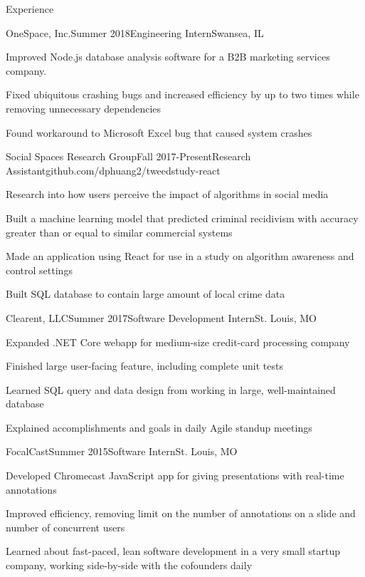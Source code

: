 \documentclass{tightResume}
\begin{document}
            \begin{rSection}{Experience}
                \begin{rSubsection}{OneSpace, Inc.}{Summer 2018}{Engineering Intern}{Swansea, IL} 
                \item Improved Node.js database analysis software for a B2B marketing services company. 
                \item Fixed ubiquitous crashing bugs and increased efficiency by up to two times while removing unnecessary dependencies
                \item Found workaround to Microsoft Excel bug that caused system crashes
                \end{rSubsection}

                \begin{rSubsection}{Social Spaces Research Group}{Fall 2017-Present}{Research Assistant}{github.com/dphuang2/tweedstudy-react}{}
                \item Research into how users perceive the impact of algorithms in social media
                \item Built a machine learning model that predicted criminal recidivism with accuracy greater than or equal to similar commercial systems
                \item Made an application using React for use in a study on algorithm awareness and control settings
                \item Built SQL database to contain large amount of local crime data
                \end{rSubsection}

                \begin{rSubsection}{Clearent, LLC}{Summer 2017}{Software Development Intern}{St. Louis, MO}
                \item Expanded .NET Core webapp for medium-size credit-card processing company
                \item Finished large user-facing feature, including complete unit tests
                \item Learned SQL query and data design from working in large, well-maintained database
                \item Explained accomplishments and goals in daily Agile standup meetings
                \end{rSubsection}

                \begin{rSubsection}{FocalCast}{Summer 2015}{Software Intern}{St. Louis, MO}{}
                \item Developed Chromecast JavaScript app for giving presentations with real-time annotations
                \item Improved efficiency, removing limit on the number of annotations on a slide and number of concurrent users
                \item Learned about fast-paced, lean software development in a very small startup company, working side-by-side with the cofounders daily
                \end{rSubsection}

            \end{rSection}
\end{document}
